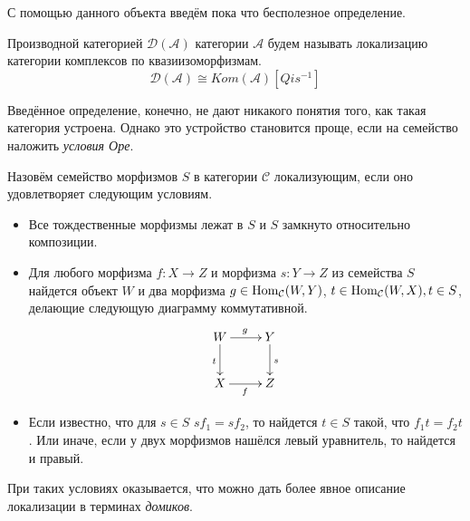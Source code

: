 \documentclass[../hw_main.tex]{subfiles}
\begin{document}
  С помощью данного объекта введём пока что бесполезное определение.
  \begin{to_def}\label{DerCat}
    Производной категорией $\mathcal{D}(\mathcal{A})$ категории $\mathcal{A}$ будем называть локализацию категории комплексов по квазиизоморфизмам.
    \begin{equation*}
      \mathcal{D}(\mathcal{A}) \cong Kom(\mathcal{A})[Qis^{-1}]
    \end{equation*}
\end{to_def}

Введённое определение, конечно, не дают никакого понятия того, как такая категория устроена. 
Однако это устройство становится проще, если на семейство наложить \emph{условия Оре}.

\begin{to_def}
    Назовём семейство морфизмов $S$ в категории $\mathcal{C}$ локализующим, если оно удовлетворяет следующим условиям.
    \begin{itemize}
      \item Все тождественные морфизмы лежат в $S$ и $S$ замкнуто относительно композиции.
      \item Для любого морфизма $f:X\to Z$ и морфизма $s:Y\to Z$ из семейства $S$ найдется объект $W$ и два морфизма $g\in \operatorname{Hom}_\mathcal{C}(W, Y)$, $t\in \operatorname{Hom}_\mathcal{C}(W, X), t\in S$, делающие следующую диаграмму коммутативной.
	\begin{equation}\label{ore_2_cond}
	  \xymatrix{W \ar[r]^g \ar[d]_t & Y\ar[d]^s\\
	  X \ar[r]_f & Z}
	\end{equation}
      \item Если известно, что для $s\in S$ $sf_1=sf_2$, то найдется $t\in S$ такой, что $f_1t=f_2t$. 
	Или иначе, если у двух морфизмов нашёлся левый уравнитель, то найдется и правый.
    \end{itemize}
      \label{ore_conditions}
    \end{to_def}

    При таких условиях оказывается, что можно дать более явное описание локализации в терминах \emph{домиков}.
\end{document}
